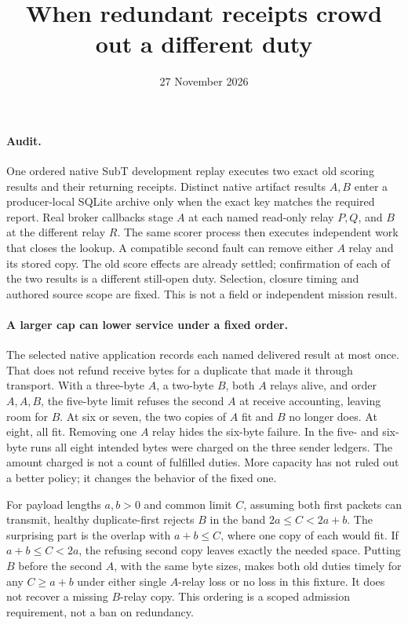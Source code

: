 \documentclass[11pt]{article}
\title{When redundant receipts crowd out a different duty}
\date{27 November 2026}
\begin{document}
\maketitle
\paragraph{Audit.}
One ordered native SubT development replay executes two exact
old scoring results and their returning receipts. Distinct native
artifact results \(A,B\) enter a producer-local SQLite archive
only when the exact key matches the required report. Real broker
callbacks stage \(A\) at each named read-only relay \(P,Q\), and
\(B\) at the different relay \(R\). The same scorer process then
executes independent work that closes the lookup. A compatible
second fault can remove either \(A\) relay and its stored copy.
The old score effects are already settled; confirmation of each
of the two results is a different still-open duty. Selection,
closure timing and authored source scope are fixed. This is not
a field or independent mission result.

\paragraph{A larger cap can lower service under a fixed order.}
The selected native application records each named delivered
result at most once. That does not refund receive bytes for
a duplicate that made it through transport. With a three-byte
\(A\), a two-byte \(B\), both \(A\) relays alive, and order
\(A,A,B\), the five-byte limit refuses the second \(A\) at
receive accounting, leaving room for \(B\). At six or seven,
the two copies of \(A\) fit and \(B\) no longer does. At eight,
all fit. Removing one \(A\) relay hides the six-byte failure.
In the five- and six-byte runs all eight intended bytes
were charged on the three sender ledgers. The amount charged
is not a count of fulfilled duties. More capacity has not ruled
out a better policy; it changes the behavior of the fixed one.

For payload lengths \(a,b>0\) and common limit \(C\), assuming
both first packets can transmit, healthy duplicate-first
rejects \(B\) in the band \(2a\le C<2a+b\).
The surprising part is the overlap with \(a+b\le C\), where
one copy of each would fit. If \(a+b\le C<2a\),
the refusing second copy leaves exactly the needed space.
Putting \(B\) before the second \(A\), with the same byte
sizes, makes both old duties timely for any \(C\ge a+b\)
under either single \(A\)-relay loss or no loss in this fixture.
It does not recover a missing \(B\)-relay copy. This ordering
is a scoped admission requirement, not a ban on redundancy.
\end{document}
